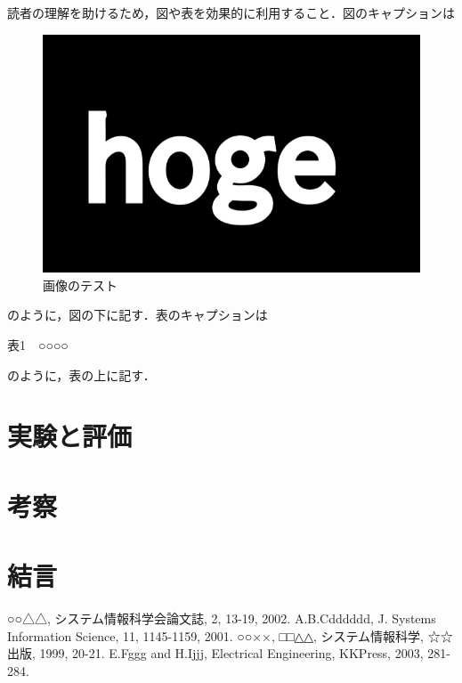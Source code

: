 \documentclass[11pt]{jarticle}
\begin{document}
読者の理解を助けるため，図や表を効果的に利用すること．図のキャプションは

\begin{figure}[H]
  \includegraphics[scale=0.5]{hoge.png}
  \caption{画像のテスト}
  \label{fig1}
\end{figure}

のように，図の下に記す．表のキャプションは

\begin{center}表1　○○○○\end{center}

のように，表の上に記す．

\section{実験と評価}

\section{考察}

\section{結言}

\begin{thebibliography}{99}
	○○△△, システム情報科学会論文誌, 2, 13-19, 2002.
	A.B.Cdddddd, J. Systems Information Science, 11, 1145-1159, 2001.
	○○××, □□△△, システム情報科学, ☆☆出版, 1999, 20-21.
	E.Fggg and H.Ijjj, Electrical Engineering, KKPress, 2003, 281-284.
\end{thebibliography}
\end{document}
